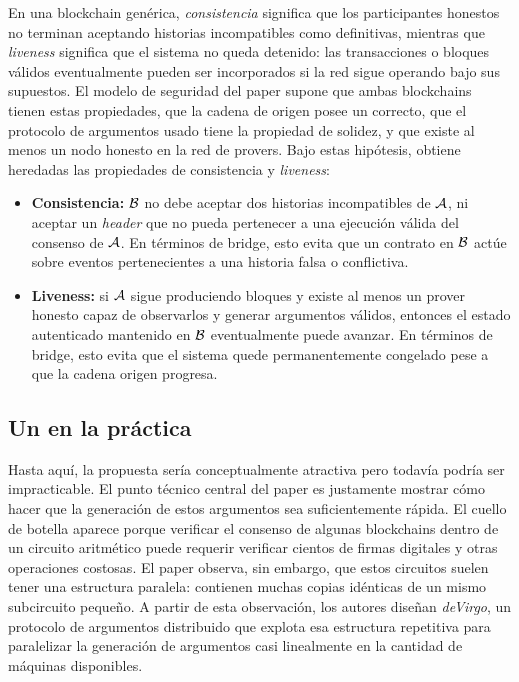 En una blockchain genérica, \emph{consistencia} significa que los participantes honestos no terminan aceptando historias incompatibles como definitivas, mientras que \emph{liveness} significa que el sistema no queda detenido: las transacciones o bloques válidos eventualmente pueden ser incorporados si la red sigue operando bajo sus supuestos. El modelo de seguridad del paper supone que ambas blockchains tienen estas propiedades, que la cadena de origen posee un \LightClientProtocol correcto, que el protocolo de argumentos \ZK usado tiene la propiedad de solidez, y que existe al menos un nodo honesto en la red de provers. Bajo estas hipótesis, \zkBridge obtiene heredadas las propiedades de consistencia y \textit{liveness}:
\begin{itemize}[noitemsep]
		\item \textbf{Consistencia:} $\mathcal{B}$ no debe aceptar dos historias incompatibles de $\mathcal{A}$, ni aceptar un \textit{header} que no pueda pertenecer a una ejecución válida del consenso de $\mathcal{A}$. En términos de bridge, esto evita que un contrato en $\mathcal{B}$ actúe sobre eventos pertenecientes a una historia falsa o conflictiva.
		\item \textbf{Liveness:} si $\mathcal{A}$ sigue produciendo bloques y existe al menos un prover honesto capaz de observarlos y generar argumentos válidos, entonces el estado autenticado mantenido en $\mathcal{B}$ eventualmente puede avanzar. En términos de bridge, esto evita que el sistema quede permanentemente congelado pese a que la cadena origen progresa.
\end{itemize}

\subsection{Un \zkBridge en la práctica}
\label{subsec:zk-bridge-un-zkbridge-en-la-practica}

Hasta aquí, la propuesta sería conceptualmente atractiva pero todavía podría ser impracticable. El punto técnico central del paper es justamente mostrar cómo hacer que la generación de estos argumentos sea suficientemente rápida. El cuello de botella aparece porque verificar el consenso de algunas blockchains dentro de un circuito aritmético puede requerir verificar cientos de firmas digitales y otras operaciones costosas. El paper observa, sin embargo, que estos circuitos suelen tener una estructura paralela: contienen muchas copias idénticas de un mismo subcircuito pequeño. A partir de esta observación, los autores diseñan \emph{deVirgo}, un protocolo de argumentos distribuido que explota esa estructura repetitiva para paralelizar la generación de argumentos casi linealmente en la cantidad de máquinas disponibles.

